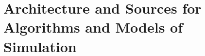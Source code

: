 


\chapter{Architecture and Sources for Algorithms and Models of Simulation} %

\label{ch:methodology} %








